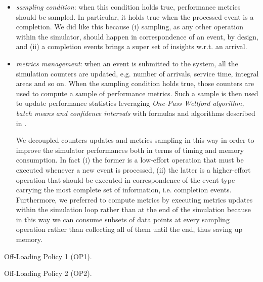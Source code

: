 \begin{itemize}
	\item \textit{sampling condition}: when this condition holds true, performance metrics should be sampled. 
	In particular, it holds true when the processed event is a completion. 
	We did like this because 
	(i) sampling, as any other operation within the simulator, should happen in correspondence of an event, by design, and
	(ii) a completion events brings a super set of insights w.r.t. an arrival.
	
	
	\item \textit{metrics management}: when an event is submitted to the system, all the simulation counters are updated, e.g. number of arrivals, service time, integral areas and so on. 
	When the sampling condition holds true, those counters are used to compute a sample of performance metrics. Such a sample is then used to update performance statistics leveraging \textit{One-Pass Wellford algorithm, batch means and confidence intervals} with formulas and algorithms described in \cite{leemis2006discrete}.
	
	We decoupled counters updates and metrics sampling in this way in order to improve the simulator performances both in terms of timing and memory consumption.
	In fact
	(i) the former is a low-effort operation that must be executed whenever a new event is processed,
	(ii) the latter is a higher-effort operation that should be executed in correspondence of the event type carrying the most complete set of information, i.e. completion events.
	Furthermore, we preferred to compute metrics by executing metrics updates within the simulation loop rather than at the end of the simulation because in this way we can consume subsets of data points at every sampling operation rather than collecting all of them until the end, thus saving up memory.
\end{itemize}

\begin{algorithm}
	\SetAlgoLined
	\caption{Off-Loading Policy 1 (OP1).}
	\label{alg:off-loading-policy-1}
\end{algorithm}

\begin{algorithm}
	\SetAlgoLined
	\caption{Off-Loading Policy 2 (OP2).}
	\label{alg:off-loading-policy-2}
\end{algorithm}

